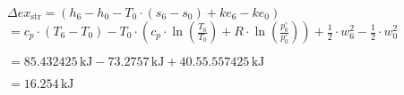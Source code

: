 \( \Delta ex_{\text{str}} = (h_6 - h_0 - T_0 \cdot (s_6 - s_0) + ke_6 - ke_0) \)  
\( = c_p \cdot (T_6 - T_0) - T_0 \cdot (c_p \cdot \ln \left( \frac{T_6}{T_0} \right) + R \cdot \ln \left( \frac{p_6^{\circ}}{p_0^{\circ}} \right)) + \frac{1}{2} \cdot w_6^2 - \frac{1}{2} \cdot w_0^2 \)  

\( = 85.432425 \, \text{kJ} - 73.2757 \, \text{kJ} + 40.55.557425 \, \text{kJ} \)  

\( = 16.254 \, \text{kJ} \)
